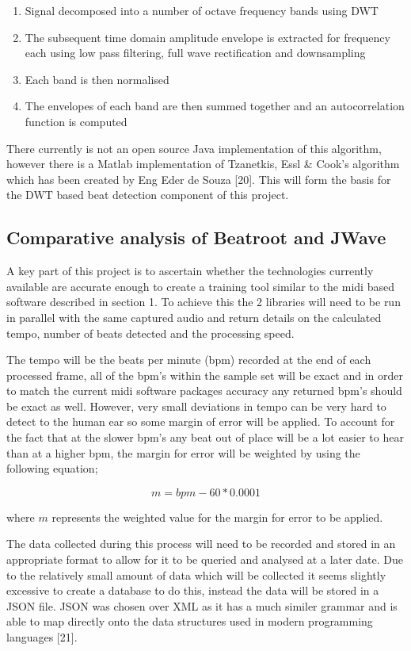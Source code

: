 \documentclass[a4paper, 11pt]{article}
\begin{document}
\begin{enumerate}
\item Signal decomposed into a number of octave frequency bands using DWT
\item The subsequent time domain amplitude envelope is extracted for frequency each using low pass filtering, full wave rectification and downsampling
\item Each band is then normalised
\item The envelopes of each band are then summed together and an autocorrelation function is computed
\end{enumerate}

There currently is not an open source Java implementation of this algorithm, however there is a Matlab implementation of Tzanetkis, Essl \& Cook's algorithm which has been created by Eng Eder de Souza [20]. This will form the basis for the DWT based beat detection component of this project.

\subsection{Comparative analysis of Beatroot and JWave}
A key part of this project is to ascertain whether the technologies currently available are accurate enough to create a training tool similar to the midi based software described in section 1. To achieve this the 2 libraries will need to be run in parallel with the same captured audio and return details on the calculated tempo, number of beats detected and the processing speed. 

The tempo will be the beats per minute (bpm) recorded at the end of each processed frame, all of the bpm's within the sample set will be exact and in order to match the current midi software packages accuracy any returned bpm's should be exact as well. However, very small deviations in tempo can be very hard to detect to the human ear so some margin of error will be applied. To account for the fact that at the slower bpm's any beat out of place will be a lot easier to hear than at a higher bpm, the margin for error will be weighted by using the following equation;

\[ m = bpm - 60 * 0.0001\]
\begin{flushleft}
where \(m\) represents the weighted value for the margin for error to be applied.
\end{flushleft}
The data collected during this process will need to be recorded and stored in an appropriate format to allow for it to be queried and analysed at a later date. Due to the relatively small amount of data which will be collected it seems slightly excessive to create a database to do this, instead the data will be stored in a JSON file. JSON was chosen over XML as it has a much similer grammar and is able to map directly onto the data structures used in modern programming languages [21].
\end{document}
